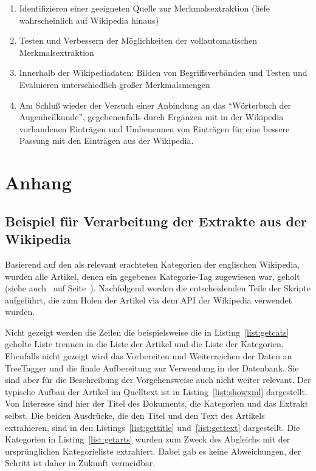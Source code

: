 \documentclass[pagesize,paper=A4,DIV=calc,fontsize=12pt,draft=false]{scrreprt}
\begin{document}
\begin{enumerate}
\item Identifizieren einer geeigneten Quelle zur Merkmalsextraktion (liefe wahrscheinlich auf Wikipedia hinaus)
\item Testen und Verbessern der Möglichkeiten der vollautomatischen Merkmalsextraktion
\item Innerhalb der Wikipediadaten: Bilden von Begriffsverbänden und Testen und Evaluieren unterschiedlich großer Merkmalsmengen
\item Am Schluß wieder der Versuch einer Anbindung an das \enquote{Wörterbuch der Augenheilkunde}, gegebenenfalls durch Ergänzen mit in der Wikipedia vorhandenen Einträgen und Umbenennen von Einträgen für eine bessere Passung mit den Einträgen aus der Wikipedia.
\end{enumerate}

\chapter{Anhang}

\section{Beispiel für Verarbeitung der Extrakte aus der Wikipedia}

Basierend auf den als relevant erachteten Kategorien der englischen Wikipedia, wurden alle Artikel, denen ein gegebenes Kategorie-Tag zugewiesen war, geholt (siehe auch\emph{~} auf Seite~\pageref{subsec:wiki_cats}).
Nachfolgend werden die entscheidenden Teile der Skripte aufgeführt, die zum Holen der Artikel via dem API der Wikipedia verwendet wurden.

Nicht gezeigt werden die Zeilen die beispielsweise die in Listing~\ref{list:getcats} geholte Liste trennen in die Liste der Artikel und die Liste der Kategorien.
Ebenfalls nicht gezeigt wird das Vorbereiten und Weiterreichen der Daten an TreeTagger und die finale Aufbereitung zur Verwendung in der Datenbank.
Sie sind aber für die Beschreibung der Vorgehensweise auch nicht weiter relevant.
Der typische Aufbau der Artikel im Quelltext ist in Listing~\ref{list:showxml}  dargestellt.
Von Interesse sind hier der Titel des Dokuments, die Kategorien und das Extrakt selbst. 
Die beiden Ausdrücke, die den Titel und den Text des Artikels extrahieren, sind in den Listings~\ref{list:gettitle} und~\ref{list:gettext} dargestellt.
Die Kategorien in Listing~\ref{list:getarts} wurden zum Zweck des Abgleichs mit der ursprünglichen Kategorieliste extrahiert.
Dabei gab es keine Abweichungen, der Schritt ist daher in Zukunft vermeidbar. 
\end{document}
